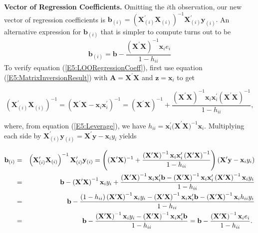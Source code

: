 \textbf{Vector of Regression Coefficients.} Omitting the $i$th
observation, our new vector of regression coefficients is $
\mathbf{b}_{(i)}=\left(
\mathbf{X}_{(i)}^{\prime}\mathbf{X}_{(i)}\right)
^{-1}\mathbf{X}_{(i)}^{\prime}\mathbf{y}_{(i)}. $ An alternative
expression for $\mathbf{b}_{(i)}$ that is simpler to compute turns
out to be
\begin{equation}\label{E5:LOORegressionCoeff}
\mathbf{b}_{(i)}=\mathbf{b}-\frac{\left( \mathbf{X}^{\prime}\mathbf{X}%
\right) ^{-1}\mathbf{x}_i e_i}{1-h_{ii}}
\end{equation}
To verify equation (\ref{E5:LOORegressionCoeff}), first use equation
(\ref{E5:MatrixInversionResult}) with
$\mathbf{A}=\mathbf{X}^{\prime}\mathbf{X}$ and
$\mathbf{z}=\mathbf{x}_i$ to get
\begin{center}
\[
\left( \mathbf{X}_{(i)}^{\prime}\mathbf{X}_{(i)}\right) ^{-1}=(\mathbf{X}%
^{\prime}\mathbf{X-x}_i\mathbf{x}_i^{\prime})^{-1}=(\mathbf{X}^{\prime}\mathbf{X})^{-1}+\frac{\left( \mathbf{X}^{\prime}\mathbf{X}\right) ^{-1}%
\mathbf{x}_i\mathbf{x}_i^{\prime}\left( \mathbf{X}^{\prime}\mathbf{X}%
\right) ^{-1}}{1-h_{ii}},
\]
\end{center}
where, from equation (\ref{E5:Leverage}), we have $h_{ii}=\mathbf{x}_i^{\prime}%
\mathbf{(X}^{\prime}\mathbf{X)}^{-1}\mathbf{x}_i$. Multiplying each
side
by $\mathbf{X}_{(i)}^{\prime}\mathbf{y}_{(i)}=\mathbf{X}^{\prime}\mathbf{y}%
-\mathbf{x}_iy_i$ yields

\begin{center}
\begin{eqnarray*}
\mathbf{b}_{(i)} &=&\left(
\mathbf{X}_{(i)}^{\prime}\mathbf{X}_{(i)}\right)
^{-1}\mathbf{X}_{(i)}^{\prime}\mathbf{y}_{(i)}=\left( (\mathbf{X}^{\prime}%
\mathbf{X})^{-1}+\frac{\left( \mathbf{X}^{\prime}\mathbf{X}\right) ^{-1}%
\mathbf{x}_i\mathbf{x}_i^{\prime}\left( \mathbf{X}^{\prime}\mathbf{X}%
\right) ^{-1}}{1-h_{ii}}\right) \left( \mathbf{X}^{\prime}\mathbf{y}-%
\mathbf{x}_iy_i\right)  \\
&=&\mathbf{b}-\left( \mathbf{X}^{\prime}\mathbf{X}\right) ^{-1}\mathbf{x}%
_iy_i+\frac{\left( \mathbf{X}^{\prime}\mathbf{X}\right) ^{-1}\mathbf{x}%
_i\mathbf{x}_i^{\prime}\mathbf{b}-\left( \mathbf{X}^{\prime}\mathbf{X}%
\right) ^{-1}\mathbf{x}_i\mathbf{x}_i^{\prime}\left(
\mathbf{X}^{\prime}\mathbf{X}\right) ^{-1}\mathbf{x}_iy_i}{1-h_{ii}} \\
&=&\mathbf{b}-\frac{\left( 1-h_{ii}\right) \left( \mathbf{X}^{\prime}%
\mathbf{X}\right) ^{-1}\mathbf{x}_iy_i-\left( \mathbf{X}^{\prime}%
\mathbf{X}\right) ^{-1}\mathbf{x}_i\mathbf{x}_i^{\prime}\mathbf{b}%
-\left( \mathbf{X}^{\prime}\mathbf{X}\right) ^{-1}\mathbf{x}_ih_{ii}y_i%
}{1-h_{ii}} \\
&=&\mathbf{b}-\frac{\left( \mathbf{X}^{\prime}\mathbf{X}\right) ^{-1}%
\mathbf{x}_iy_i-\left( \mathbf{X}^{\prime}\mathbf{X}\right) ^{-1}%
\mathbf{x}_i\mathbf{x}_i^{\prime}\mathbf{b}}{1-h_{ii}}=\mathbf{b}-\frac{%
\left( \mathbf{X}^{\prime}\mathbf{X}\right) ^{-1}\mathbf{x}_i e_i}{%
1-h_{ii}}.\text{ }
\end{eqnarray*}%
\qquad
\end{center}

